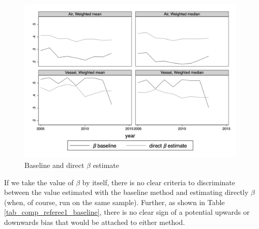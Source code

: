 \documentclass[11pt,twoside, authoryear]{elsarticle}
\begin{document}
\begin{figure}[htbp]
	\caption{Baseline and direct $\beta$ estimate }
\label{fig:beta_comp_direct_estimate}
	\begin{center}
		\includegraphics[height=8cm]
		{../scatter_chronology_baseline_referee1.png}
	\end{center}
\end{figure}


If we take the value of $\beta$ by itself, there is no clear criteria to discriminate between the value estimated with the baseline method and estimating directly $\beta$ (when, of course, run on the same sample). Further, as shown in Table \ref{tab_comp_referee1_baseline}, there is no clear sign of a potential upwards or downwards bias that would be attached to either method.
\end{document}
